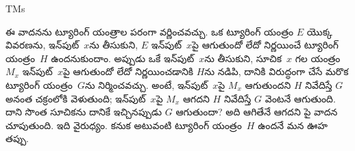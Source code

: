 \documentclass[../../../include/open-logic-section]{subfiles}
\begin{document}
\begin{tagblock}{TMs}
\begin{explain}
ఈ వాదనను ట్యూరింగ్ యంత్రాల పరంగా వర్ణించవచ్చు. ఒక ట్యూరింగ్ యంత్రం
$E$ యొక్క వివరణను, ఇన్‌పుట్~$x$ను తీసుకుని, $E$ ఇన్‌పుట్~$x$పై
ఆగుతుందో లేదో నిర్ణయించే ట్యూరింగ్ యంత్రం~$H$ ఉందనుకుందాం. అప్పుడు
ఒకే ఇన్‌పుట్~$x$ను తీసుకుని, సూచిక~$x$ గల యంత్రం $M_x$ ఇన్‌పుట్~$x$పై
ఆగుతుందో లేదో నిర్ణయించడానికి $H$ను నడిపి, దానికి విరుద్ధంగా చేసే
మరొక ట్యూరింగ్ యంత్రం~$G$ను నిర్మించవచ్చు. అంటే, ఇన్‌పుట్~$x$పై
$M_x$ ఆగుతుందని $H$ నివేదిస్తే $G$ అనంత చక్రంలోకి వెళుతుంది;
ఇన్‌పుట్~$x$పై $M_x$ ఆగదని $H$ నివేదిస్తే $G$ వెంటనే ఆగుతుంది.
దాని సొంత సూచికను దానికే ఇచ్చినప్పుడు $G$ ఆగుతుందా? అది ఆగితేనే
ఆగదని పై వాదన చూపుతుంది. ఇది వైరుధ్యం. కనుక అటువంటి ట్యూరింగ్
యంత్రం~$H$ ఉందనే మన ఊహ తప్పు.
\end{explain}
\end{tagblock}
\end{document}
